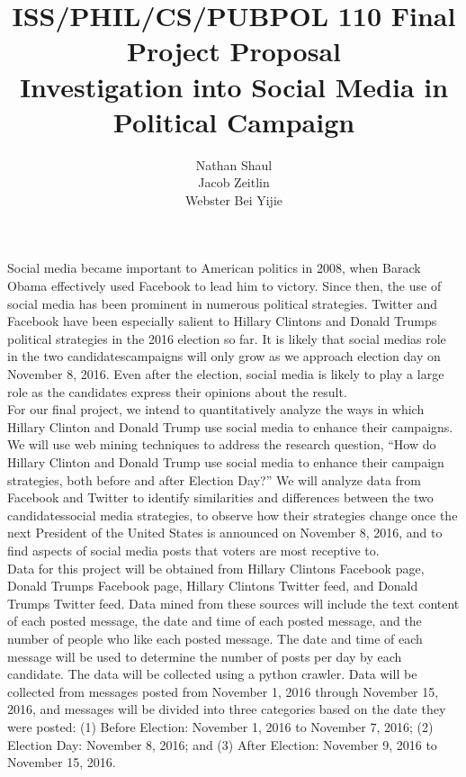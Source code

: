 \documentclass{article}
\begin{document}
\title{ISS/PHIL/CS/PUBPOL 110 Final Project Proposal \\ Investigation into Social Media in Political Campaign}
\author{Nathan Shaul \\ Jacob Zeitlin \\ Webster Bei Yijie}
\maketitle
\indent Social media became important to American politics in 2008, when Barack Obama effectively used Facebook to lead him to victory. Since then, the use of social media has been prominent in numerous political strategies. Twitter and Facebook have been especially salient to Hillary Clinton\textquotesingle s and Donald Trump\textquotesingle s political strategies in the 2016 election so far. It is likely that social media\textquotesingle s role in the two candidates\textquotesingle campaigns will only grow as we approach election day on November 8, 2016. Even after the election, social media is likely to play a large role as the candidates express their opinions about the result. \\
\indent For our final project, we intend to quantitatively analyze the ways in which Hillary Clinton and Donald Trump use social media to enhance their campaigns. We will use web mining techniques to address the research question, “How do Hillary Clinton and Donald Trump use social media to enhance their campaign strategies, both before and after Election Day?” We will analyze data from Facebook and Twitter to identify similarities and differences between the two candidates\textquotesingle social media strategies, to observe how their strategies change once the next President of the United States is announced on November 8, 2016, and to find aspects of social media posts that voters are most receptive to.\\
\indent Data for this project will be obtained from Hillary Clinton\textquotesingle s Facebook page, Donald Trump\textquotesingle s Facebook page, Hillary Clinton\textquotesingle s Twitter feed, and Donald Trump\textquotesingle s Twitter feed. Data mined from these sources will include the text content of each posted message, the date and time of each posted message, and the number of people who like each posted message. The date and time of each message will be used to determine the number of posts per day by each candidate. The data will be collected using a python crawler. Data will be collected from messages posted from November 1, 2016 through November 15, 2016, and messages will be divided into three categories based on the date they were posted: (1) Before Election: November 1, 2016 to November 7, 2016; (2) Election Day: November 8, 2016; and (3) After Election: November 9, 2016 to November 15, 2016. \\
\end{document}
